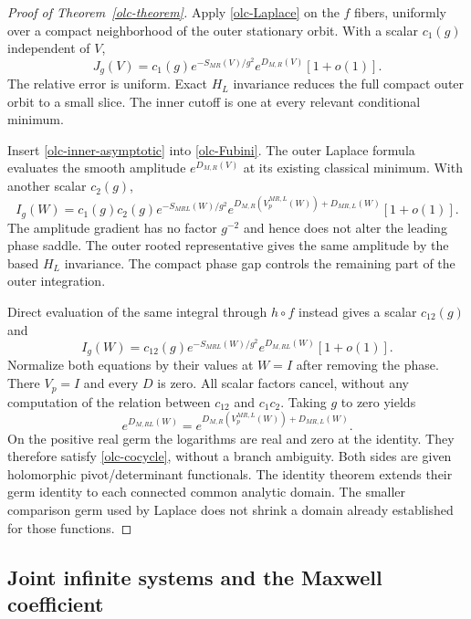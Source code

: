 \documentclass[11pt]{article}
\theoremstyle{remark}
\begin{document}
\begin{proof}[Proof of Theorem~\ref{olc-theorem}]
Apply \eqref{olc-Laplace} on the $f$ fibers, uniformly over
a compact neighborhood of the outer stationary orbit.
With a scalar $c_1(g)$ independent of $V$,
\begin{equation}
 J_g(V)=c_1(g)e^{-S_{MR}(V)/g^2}
                   e^{D_{M,R}(V)}[1+o(1)] .
 \label{olc-inner-asymptotic}
\end{equation}
The relative error is uniform. Exact $H_L$ invariance reduces
the full compact outer orbit to a small slice. The inner
cutoff is one at every relevant conditional minimum.

Insert \eqref{olc-inner-asymptotic} into
\eqref{olc-Fubini}. The outer Laplace formula evaluates the
smooth amplitude $e^{D_{M,R}(V)}$ at its existing classical
minimum. With another scalar $c_2(g)$,
\begin{equation}
 I_g(W)=c_1(g)c_2(g)e^{-S_{MRL}(W)/g^2}
       e^{D_{M,R}(V_p^{MR,L}(W))+D_{MR,L}(W)}[1+o(1)] .
 \label{olc-sequential-asymptotic}
\end{equation}
The amplitude gradient has no factor $g^{-2}$ and hence
does not alter the leading phase saddle. The outer rooted
representative gives the same amplitude by the based
$H_L$ invariance. The compact phase gap controls the
remaining part of the outer integration.

Direct evaluation of the same integral through $h\circ f$
instead gives a scalar $c_{12}(g)$ and
\begin{equation}
 I_g(W)=c_{12}(g)e^{-S_{MRL}(W)/g^2}
                         e^{D_{M,RL}(W)}[1+o(1)] .
 \label{olc-direct-asymptotic}
\end{equation}
Normalize both equations by their values at $W=I$ after
removing the phase. There $V_p=I$ and every $D$ is zero.
All scalar factors cancel, without any computation of the
relation between $c_{12}$ and $c_1c_2$. Taking $g$ to zero
yields
\[
 e^{D_{M,RL}(W)}
   =e^{D_{M,R}(V_p^{MR,L}(W))+D_{MR,L}(W)} .
\]
On the positive real germ the logarithms are real and
zero at the identity. They therefore satisfy
\eqref{olc-cocycle}, without a branch ambiguity.
Both sides are given holomorphic pivot/determinant
functionals. The identity theorem extends their germ
identity to each connected common analytic domain.
The smaller comparison germ used by Laplace does not
shrink a domain already established for those functions.
\end{proof}

\subsection{Joint infinite systems and the Maxwell coefficient}
\label{olc-limit-section}
\end{document}
